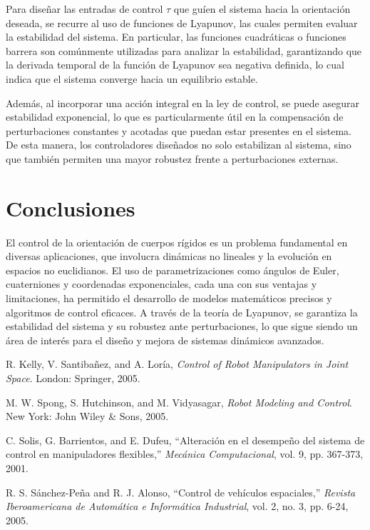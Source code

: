 \documentclass[conference]{IEEEtran}
\begin{document}
Para diseñar las entradas de control \( \tau \) que guíen el sistema hacia la orientación deseada, se recurre al uso de funciones de Lyapunov, las cuales permiten evaluar la estabilidad del sistema. En particular, las funciones cuadráticas o funciones barrera son comúnmente utilizadas para analizar la estabilidad, garantizando que la derivada temporal de la función de Lyapunov sea negativa definida, lo cual indica que el sistema converge hacia un equilibrio estable.

Además, al incorporar una acción integral en la ley de control, se puede asegurar estabilidad exponencial, lo que es particularmente útil en la compensación de perturbaciones constantes y acotadas que puedan estar presentes en el sistema. De esta manera, los controladores diseñados no solo estabilizan al sistema, sino que también permiten una mayor robustez frente a perturbaciones externas.


\section*{Conclusiones}

El control de la orientación de cuerpos rígidos es un problema fundamental en diversas aplicaciones, que involucra dinámicas no lineales y la evolución en espacios no euclidianos. El uso de parametrizaciones como ángulos de Euler, cuaterniones y coordenadas exponenciales, cada una con sus ventajas y limitaciones, ha permitido el desarrollo de modelos matemáticos precisos y algoritmos de control eficaces. A través de la teoría de Lyapunov, se garantiza la estabilidad del sistema y su robustez ante perturbaciones, lo que sigue siendo un área de interés para el diseño y mejora de sistemas dinámicos avanzados.

\begin{thebibliography}{00}
	R. Kelly, V. Santibañez, and A. Loría, \textit{Control of Robot Manipulators in Joint Space}. London: Springer, 2005.

	M. W. Spong, S. Hutchinson, and M. Vidyasagar, \textit{Robot Modeling and Control}. New York: John Wiley \& Sons, 2005.

	C. Solis, G. Barrientos, and E. Dufeu, “Alteración en el desempeño del sistema de control en manipuladores flexibles,” \textit{Mecánica Computacional}, vol. 9, pp. 367-373, 2001.

	R. S. Sánchez-Peña and R. J. Alonso, “Control de vehículos espaciales,” \textit{Revista Iberoamericana de Automática e Informática Industrial}, vol. 2, no. 3, pp. 6-24, 2005.

\end{thebibliography}
\end{document}
